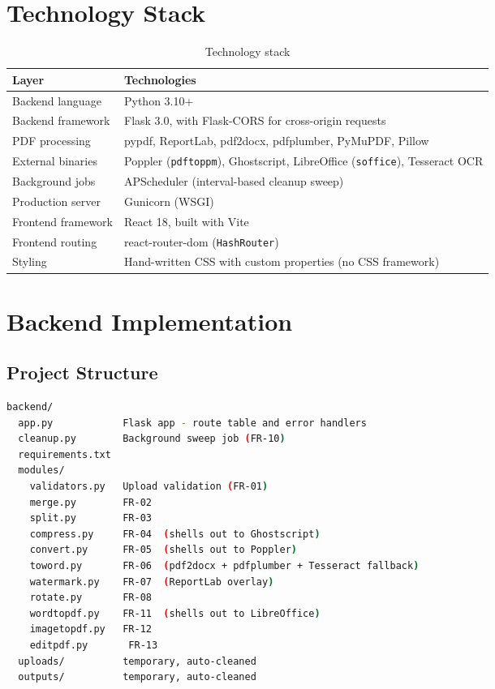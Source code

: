 \documentclass[12pt,a4paper]{report}
\begin{document}
\section{Technology Stack}
\begin{table}[h]
\centering
\caption{Technology stack}
\label{tab:stack}
\begin{tabular}{@{}p{2.6cm}p{9.5cm}@{}}
\toprule
\textbf{Layer} & \textbf{Technologies} \\
\midrule
Backend language & Python 3.10+ \\
Backend framework & Flask 3.0, with Flask-CORS for cross-origin requests \\
PDF processing & pypdf, ReportLab, pdf2docx, pdfplumber, PyMuPDF, Pillow \\
External binaries & Poppler (\texttt{pdftoppm}), Ghostscript, LibreOffice (\texttt{soffice}), Tesseract OCR \\
Background jobs & APScheduler (interval-based cleanup sweep) \\
Production server & Gunicorn (WSGI) \\
Frontend framework & React 18, built with Vite \\
Frontend routing & react-router-dom (\texttt{HashRouter}) \\
Styling & Hand-written CSS with custom properties (no CSS framework) \\
\bottomrule
\end{tabular}
\end{table}

\section{Backend Implementation}

\subsection{Project Structure}
\begin{lstlisting}[language=bash, caption={Backend directory layout}, label=lst:structure]
backend/
  app.py            Flask app - route table and error handlers
  cleanup.py        Background sweep job (FR-10)
  requirements.txt
  modules/
    validators.py   Upload validation (FR-01)
    merge.py        FR-02
    split.py        FR-03
    compress.py     FR-04  (shells out to Ghostscript)
    convert.py      FR-05  (shells out to Poppler)
    toword.py       FR-06  (pdf2docx + pdfplumber + Tesseract fallback)
    watermark.py    FR-07  (ReportLab overlay)
    rotate.py       FR-08
    wordtopdf.py    FR-11  (shells out to LibreOffice)
    imagetopdf.py   FR-12
    editpdf.py       FR-13
  uploads/          temporary, auto-cleaned
  outputs/          temporary, auto-cleaned
\end{lstlisting}
\end{document}
